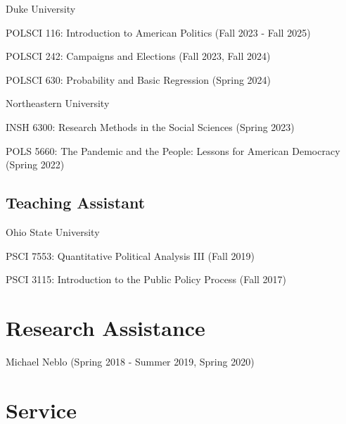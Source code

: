 \documentclass[letterpaper]{article}
\renewenvironment{itemize}{
  \begin{list}{}{
    \setlength{\leftmargin}{1.5em}
  }
}{
  \end{list}
}
\begin{document}
\begin{itemize}

\item Duke University
	\begin{itemize}
	\item POLSCI 116: Introduction to American Politics (Fall 2023 - Fall 2025)
	\item POLSCI 242: Campaigns and Elections (Fall 2023, Fall 2024)
	\item POLSCI 630: Probability and Basic Regression (Spring 2024)
	\end{itemize}

\item Northeastern University 
	\begin{itemize}
	\item INSH 6300: Research Methods in the Social Sciences (Spring 2023)
	\item POLS 5660: The Pandemic and the People: Lessons for American Democracy (Spring 2022)
	\end{itemize}
\end{itemize}

\subsection*{Teaching Assistant}

\begin{itemize}
\item Ohio State University 
\begin{itemize}
\item PSCI 7553: Quantitative Political Analysis III (Fall 2019)
\item PSCI 3115: Introduction to the Public Policy Process (Fall 2017)
\end{itemize}
\end{itemize}

\section*{Research Assistance}
\begin{itemize}
\item  Michael Neblo (Spring 2018 - Summer 2019, Spring 2020)
\end{itemize}

\section*{Service}
\end{document}
